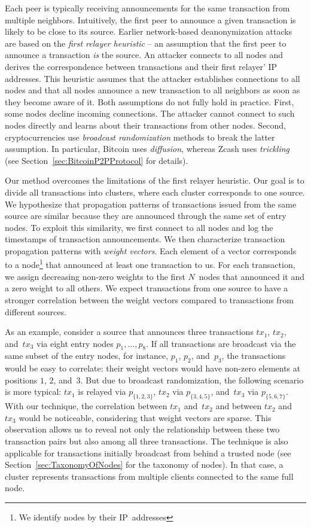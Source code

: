 Each peer is typically receiving announcements for the same transaction from multiple neighbors.
Intuitively, the first peer to announce a given transaction is likely to be close to its source.
Earlier network-based deanonymization attacks~\cite{Biryukov2014, Koshy2014} are based on the \textit{first relayer heuristic} -- an assumption that the first peer to announce a transaction \textit{is} the source.
An attacker connects to all nodes and derives the correspondence between transactions and their first relayer' IP addresses.
This heuristic assumes that the attacker establishes connections to all nodes and that all nodes announce a new transaction to all neighbors as soon as they become aware of it.
Both assumptions do not fully hold in practice.
First, some nodes decline incoming connections.
The attacker cannot connect to such nodes directly and learns about their transactions from other nodes.
Second, cryptocurrencies use \textit{broadcast randomization} methods to break the latter assumption.
In particular, Bitcoin uses \textit{diffusion}, whereas Zcash uses \textit{trickling} (see Section~\ref{sec:BitcoinP2PProtocol} for details).

Our method overcomes the limitations of the first relayer heuristic.
Our goal is to divide all transactions into clusters, where each cluster corresponds to one source.
We hypothesize that propagation patterns of transactions issued from the same source are similar because they are announced through the same set of entry nodes.
To exploit this similarity, we first connect to all nodes and log the timestamps of transaction announcements.
We then characterize transaction propagation patterns with \textit{weight vectors}.
Each element of a vector corresponds to a node\footnote{We identify nodes by their IP~addresses} that announced at least one transaction to us.
For each transaction, we assign decreasing non-zero weights to the first $N$~nodes that announced it and a zero weight to all others.
We expect transactions from one source to have a stronger correlation between the weight vectors compared to transactions from different sources.

As an example, consider a source that announces three transactions $tx_1$, $tx_2$, and~$tx_3$ via eight entry nodes $p_1, \dots, p_8$.
If all transactions are broadcast via the same subset of the entry nodes, for instance, $p_1$, $p_2$, and~$p_3$, the transactions would be easy to correlate: their weight vectors would have non-zero elements at positions $1$, $2$, and~$3$.
But due to broadcast randomization, the following scenario is more typical: $tx_1$ is relayed via $p_{\{1,2,3\}}$, $tx_2$ via $p_{\{3,4,5\}}$, and~$tx_3$ via $p_{\{5,6,7\}}$.
With our technique, the correlation between $tx_1$ and~$tx_2$ and between $tx_2$ and~$tx_3$ would be noticeable, considering that weight vectors are sparse.
This observation allows us to reveal not only the relationship between these two transaction pairs but also among all three transactions.
The technique is also applicable for transactions initially broadcast from behind a trusted node (see Section~\ref{sec:TaxonomyOfNodes} for the taxonomy of nodes).
In that case, a cluster represents transactions from multiple clients connected to the same full node.


